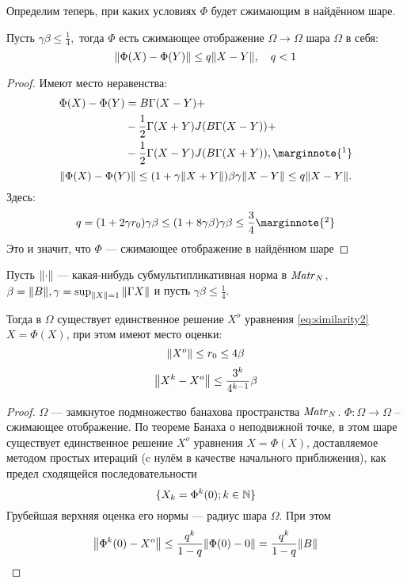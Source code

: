 Определим теперь, при каких условиях \( \Phi \) будет сжимающим в найдённом шаре.
\begin{lemma}
    Пусть \( \gamma\beta \leq \frac14, \)
    тогда \( \Phi \) есть сжимающее отображение \(\Omega\to\Omega\) шара \(\Omega\) в себя:
    \[ {\left\|{\Phi(X)-\Phi(Y)}\right\|} \leq q {\left\|{X-Y}\right\|}, \quad q<1\]
\end{lemma}
\begin{proof}
    Имеют место неравенства:
    \begin{align*}
        \Phi(X) - \Phi(Y) &= B\Gamma (X-Y) + \\
        &- \frac12 \Gamma (X + Y)J(B\Gamma(X - Y)) + \\
        &- \frac12 \Gamma (X - Y)J(B\Gamma(X + Y)),
        \marginnote{\footnotemark}
    \end{align*}
    \[
        {\left\|{\Phi(X) - \Phi(Y)}\right\|} \leq (1 + \gamma{\left\|{X+Y}\right\|})\beta\gamma {\left\|{X-Y}\right\|} \leq q{\left\|{X-Y}\right\|}.
        \]
    Здесь:
    \begin{equation}\label{eq:lipconst}
        q = (1+2\gamma r_0)\gamma\beta
        \leq (1+8\gamma\beta)\gamma\beta \leq \frac{3}{4}
        \marginnote{\footnotemark}
    \end{equation}
    Это и значит, что \( \Phi \) --- сжимающее отображение в найдённом шаре
\end{proof}

\begin{lemma}
    Пусть \( {\left\|{\cdot}\right\|} \) --- какая-нибудь субмультипликативная норма в \( \mathit{Matr}_{N} {} \),
    \( \beta={\left\|{B}\right\|}, \gamma=\sup_{{\left\|{X}\right\|}=1}{\left\|{\Gamma X}\right\|} \)
    и пусть
    \( \gamma\beta\leq\frac14. \)

    Тогда в \( \Omega \) существует единственное решение \( X^o \) уравнения
    \eqref{eq:similarity2} \( X=\Phi(X) \),
    при этом имеют место оценки:
    \[
        {\left\|{X^o}\right\|} \leq r_0 \leq 4\beta
        \]
    \[
        {\left\|{X^k - X^o}\right\|} \leq \frac{3^k}{4^{k-1}}\beta
        \]
\end{lemma}
\begin{proof}
    \( \Omega \) --- замкнутое подмножество банахова пространства \( \mathit{Matr}_{N} {} \).
    \( \Phi: \Omega\to\Omega \) -- сжимающее отображение.
    По теореме Банаха о неподвижной точке, в этом шаре существует единственное решение \( X^o \)
    уравнения \( X = \Phi (X) \),
    доставляемое методом простых итераций (c нулём в качестве начального приближения),
    как предел сходящейся последовательности
    \[
        \{X_k = \Phi^k(0); k\in\mathbb{N}\}
        \]
    Грубейшая верхняя оценка его нормы --- радиус шара \( \Omega \).
    При этом \[ {\left\|{\Phi^k(0) - X^o}\right\|} \leq \frac{q^k}{1-q} {\left\|{\Phi(0) - 0}\right\|} = \frac{q^k}{1-q}{\left\|{B}\right\|} \]
\end{proof}

